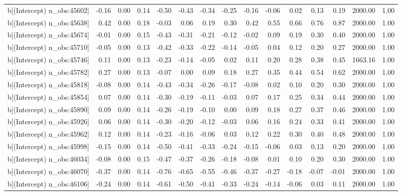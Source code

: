 \begin{table}[ht]
\begin{tabular}{rrrrrrrrrrrrrrr}
  b[(Intercept) n\_obs:45602] & -0.16 & 0.00 & 0.14 & -0.50 & -0.43 & -0.34 & -0.25 & -0.16 & -0.06 & 0.02 & 0.13 & 0.19 & 2000.00 & 1.00 \\ 
  b[(Intercept) n\_obs:45638] & 0.42 & 0.00 & 0.18 & -0.03 & 0.06 & 0.19 & 0.30 & 0.42 & 0.55 & 0.66 & 0.76 & 0.87 & 2000.00 & 1.00 \\ 
  b[(Intercept) n\_obs:45674] & -0.01 & 0.00 & 0.15 & -0.43 & -0.31 & -0.21 & -0.12 & -0.02 & 0.09 & 0.19 & 0.30 & 0.40 & 2000.00 & 1.00 \\ 
  b[(Intercept) n\_obs:45710] & -0.05 & 0.00 & 0.13 & -0.42 & -0.33 & -0.22 & -0.14 & -0.05 & 0.04 & 0.12 & 0.20 & 0.27 & 2000.00 & 1.00 \\ 
  b[(Intercept) n\_obs:45746] & 0.11 & 0.00 & 0.13 & -0.23 & -0.14 & -0.05 & 0.02 & 0.11 & 0.20 & 0.28 & 0.38 & 0.45 & 1663.16 & 1.00 \\ 
  b[(Intercept) n\_obs:45782] & 0.27 & 0.00 & 0.13 & -0.07 & 0.00 & 0.09 & 0.18 & 0.27 & 0.35 & 0.44 & 0.54 & 0.62 & 2000.00 & 1.00 \\ 
  b[(Intercept) n\_obs:45818] & -0.08 & 0.00 & 0.14 & -0.43 & -0.34 & -0.26 & -0.17 & -0.08 & 0.02 & 0.10 & 0.20 & 0.30 & 2000.00 & 1.00 \\ 
  b[(Intercept) n\_obs:45854] & 0.07 & 0.00 & 0.14 & -0.30 & -0.19 & -0.11 & -0.03 & 0.07 & 0.17 & 0.25 & 0.34 & 0.44 & 2000.00 & 1.00 \\ 
  b[(Intercept) n\_obs:45890] & 0.09 & 0.00 & 0.14 & -0.26 & -0.19 & -0.10 & 0.00 & 0.09 & 0.18 & 0.27 & 0.37 & 0.46 & 2000.00 & 1.00 \\ 
  b[(Intercept) n\_obs:45926] & 0.06 & 0.00 & 0.14 & -0.30 & -0.20 & -0.12 & -0.03 & 0.06 & 0.16 & 0.24 & 0.33 & 0.41 & 2000.00 & 1.00 \\ 
  b[(Intercept) n\_obs:45962] & 0.12 & 0.00 & 0.14 & -0.23 & -0.16 & -0.06 & 0.03 & 0.12 & 0.22 & 0.30 & 0.40 & 0.48 & 2000.00 & 1.00 \\ 
  b[(Intercept) n\_obs:45998] & -0.15 & 0.00 & 0.14 & -0.50 & -0.41 & -0.33 & -0.24 & -0.15 & -0.06 & 0.03 & 0.13 & 0.20 & 2000.00 & 1.00 \\ 
  b[(Intercept) n\_obs:46034] & -0.08 & 0.00 & 0.15 & -0.47 & -0.37 & -0.26 & -0.18 & -0.08 & 0.01 & 0.10 & 0.20 & 0.30 & 2000.00 & 1.00 \\ 
  b[(Intercept) n\_obs:46070] & -0.37 & 0.00 & 0.14 & -0.76 & -0.65 & -0.55 & -0.46 & -0.37 & -0.27 & -0.18 & -0.07 & -0.01 & 2000.00 & 1.00 \\ 
  b[(Intercept) n\_obs:46106] & -0.24 & 0.00 & 0.14 & -0.61 & -0.50 & -0.41 & -0.33 & -0.24 & -0.14 & -0.06 & 0.03 & 0.11 & 2000.00 & 1.00 \\ 

\end{tabular}
\end{table}
